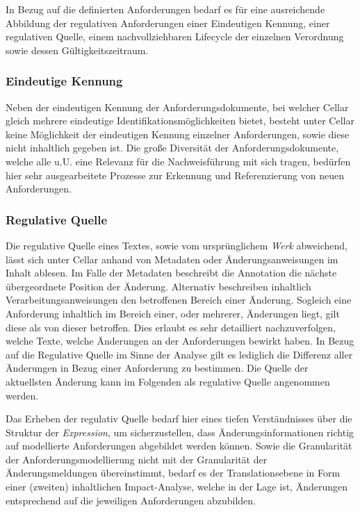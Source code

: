 In Bezug auf die definierten Anforderungen bedarf es für eine ausreichende Abbildung der regulativen Anforderungen einer Eindeutigen Kennung, einer regulativen Quelle, einem nachvollziehbaren Lifecycle der einzelnen Verordnung sowie dessen Gültigkeitszeitraum.

\subsubsection{Eindeutige Kennung}

Neben der eindeutigen Kennung der Anforderungsdokumente, bei welcher Cellar gleich mehrere eindeutige Identifikationsmöglichkeiten bietet, besteht unter Cellar keine Möglichkeit der eindeutigen Kennung einzelner Anforderungen, sowie diese nicht inhaltlich gegeben ist. 
Die große Diversität der Anforderungsdokumente, welche alle u.U. eine Relevanz für die Nachweisführung mit sich tragen, bedürfen hier sehr ausgearbeitete Prozesse zur Erkennung und Referenzierung von neuen Anforderungen.  


\subsubsection{Regulative Quelle}

Die regulative Quelle eines Textes, sowie vom ursprünglichem \textit{Werk} abweichend, lässt sich unter Cellar anhand von Metadaten oder Änderungsanweisungen im Inhalt ablesen.
Im Falle der Metadaten beschreibt die Annotation die nächste übergeordnete Position der Änderung.
Alternativ beschreiben inhaltlich Verarbeitungsanweisungen den betroffenen Bereich einer Änderung. 
Sogleich eine Anforderung inhaltlich im Bereich einer, oder mehrerer, Änderungen liegt, gilt diese als von dieser betroffen.
Dies erlaubt es sehr detailliert nachzuverfolgen, welche Texte, welche Änderungen an der Anforderungen bewirkt haben.
In Bezug auf die Regulative Quelle im Sinne der Analyse gilt es lediglich die Differenz aller Änderungen in Bezug einer Anforderung zu bestimmen.
Die Quelle der aktuellsten Änderung kann im Folgenden als regulative Quelle angenommen werden.

Das Erheben der regulativ Quelle bedarf hier eines tiefen Verständnisses über die Struktur der \textit{Expression}, um sicherzustellen, dass Änderungsinformationen richtig auf modellierte Anforderungen abgebildet werden können.
Sowie die Granularität der Anforderungsmodellierung nicht mit der Granularität der Änderungsmeldungen übereinstimmt, bedarf es der Translationsebene in Form einer (zweiten) inhaltlichen Impact-Analyse, welche in der Lage ist, Änderungen entsprechend auf die jeweiligen Anforderungen abzubilden.


